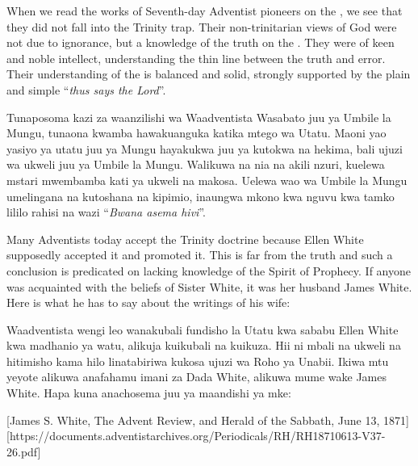 When we read the works of Seventh-day Adventist pioneers on the , we see that they did not fall into the Trinity trap. Their non-trinitarian views of God were not due to ignorance, but a knowledge of the truth on the . They were of keen and noble intellect, understanding the thin line between the truth and error. Their understanding of the  is balanced and solid, strongly supported by the plain and simple “\textit{thus says the Lord}”.


Tunaposoma kazi za waanzilishi wa Waadventista Wasabato juu ya Umbile la Mungu, tunaona kwamba hawakuanguka katika mtego wa Utatu. Maoni yao yasiyo ya utatu juu ya Mungu hayakukwa juu ya kutokwa na hekima, bali ujuzi wa ukweli juu ya Umbile la Mungu. Walikuwa na nia na akili nzuri, kuelewa mstari mwembamba kati ya ukweli na makosa. Uelewa wao wa Umbile la Mungu umelingana na kutoshana na kipimio, inaungwa mkono kwa nguvu kwa tamko lililo rahisi na wazi “\textit{Bwana asema hivi}”.


Many Adventists today accept the Trinity doctrine because Ellen White supposedly accepted it and promoted it. This is far from the truth and such a conclusion is predicated on lacking knowledge of the Spirit of Prophecy. If anyone was acquainted with the beliefs of Sister White, it was her husband James White. Here is what he has to say about the writings of his wife:


Waadventista wengi leo wanakubali fundisho la Utatu kwa sababu Ellen White kwa madhanio ya watu, alikuja kuikubali na kuikuza. Hii ni mbali na ukweli na hitimisho kama hilo linatabiriwa kukosa ujuzi wa Roho ya Unabii. Ikiwa mtu yeyote alikuwa anafahamu imani za Dada White, alikuwa mume wake James White. Hapa kuna anachosema juu ya maandishi ya mke:


[James S. White, The Advent Review, and Herald of the Sabbath, June 13, 1871][https://documents.adventistarchives.org/Periodicals/RH/RH18710613-V37-26.pdf]



